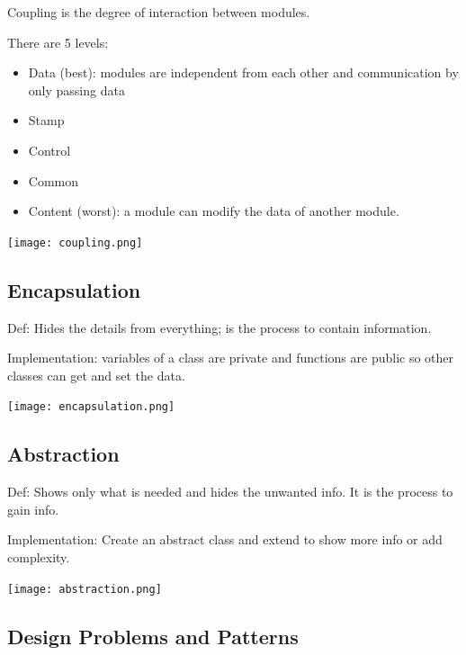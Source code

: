 \documentclass{article}
\begin{document}
    Coupling is the degree of interaction between modules.

    There are 5 levels:
    \begin{itemize}
        \item Data (best): modules are independent from each other and communication by 
        only passing data 
        \item Stamp 
        \item Control 
        \item Common 
        \item Content (worst): a module can modify the data of another module.
    \end{itemize}

    \begin{center}
        \texttt{[image: coupling.png]}
    \end{center}

    \subsection*{Encapsulation}

    Def: Hides the details from everything; is the process to contain information.

    Implementation: variables of a class are private and functions are public so other 
    classes can get and set the data.

    \begin{center}
        \texttt{[image: encapsulation.png]}
    \end{center}

    \subsection*{Abstraction}

    Def: Shows only what is needed and hides the unwanted info. It is the process to gain 
    info.

    Implementation: Create an abstract class and extend to show more info or add complexity.

    \begin{center}
        \texttt{[image: abstraction.png]}
    \end{center}

    \subsection*{Design Problems and Patterns}
\end{document}
